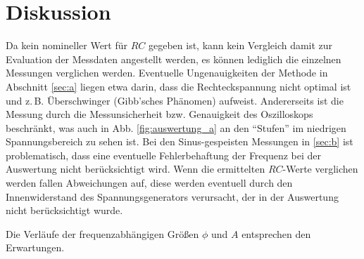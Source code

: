 \section{Diskussion}
\label{sec:Diskussion}
Da kein nomineller Wert für $RC$ gegeben ist, kann kein Vergleich damit zur Evaluation der Messdaten angestellt werden, es können lediglich die einzelnen Messungen verglichen werden. Eventuelle Ungenauigkeiten der Methode in Abschnitt \ref{sec:a} liegen etwa darin, dass die Rechteckspannung nicht optimal ist und z.\,B. Überschwinger (Gibb'sches Phänomen) aufweist. Andererseits ist die Messung durch die Messunsicherheit bzw. Genauigkeit des Oszilloskops beschränkt, was auch in Abb. \ref{fig:auswertung_a} an den \enquote{Stufen} im niedrigen Spannungsbereich zu sehen ist.
Bei den Sinus-gespeisten Messungen in \ref{sec:b} ist problematisch, dass eine eventuelle Fehlerbehaftung der Frequenz bei der Auswertung nicht berücksichtigt wird. Wenn die ermittelten $RC$-Werte verglichen werden fallen Abweichungen auf, diese werden eventuell durch den Innenwiderstand des Spannungsgenerators verursacht, der in der Auswertung nicht berücksichtigt wurde.

Die Verläufe der frequenzabhängigen Größen $\phi$ und $A$ entsprechen den Erwartungen.
